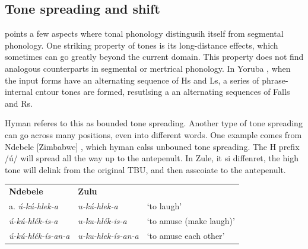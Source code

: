 
\subsection{Tone spreading and shift}
\citet{hyman2011tone} points a few aspects where tonal phonology distingusih itself
from segmental phonology. One striking property of tones is its long-distance
effects, which sometimes can go greatly beyond the current domain. This property
does not find analogous counterparts in segmental or mertrical phonology.
In Yoruba , when the input forms have an alternating
sequence of Hs and Ls, a series of phrase-internal cntour tones are formed, 
resutlsing a an alternating sequences of Falls and Rs.


\ex
{}
\xe

Hyman referes to this as bounded tone spreading. Another type of 
tone spreading can go across many positions, even into different
words. 
One example comes from Ndebele [Zimbabwe] , which hyman calss unbouned
tone spreading. The H prefix /ú/ will spread all the way up
to the antepenult. In Zule, it si diffenret, the high tone will delink from
the original TBU, and then asscoiate to the antepenult.
\ex
\begin{tabular}{lll}
      \textbf{Ndebele} & \textbf{Zulu} &\\
a.   \textit{ú-kú-hlek-a} 
     & \textit{u-kú-hlek-a} 
     & `to laugh' \\

     \textit{ú-kú-hlék-is-a} 
     & \textit{u-ku-hlék-is-a} 
     & `to amuse (make laugh)' \\

     \textit{ú-kú-hlék-ís-an-a} 
     & \textit{u-ku-hlek-ís-an-a} 
     & `to amuse each other' \\
\end{tabular}
\xe

